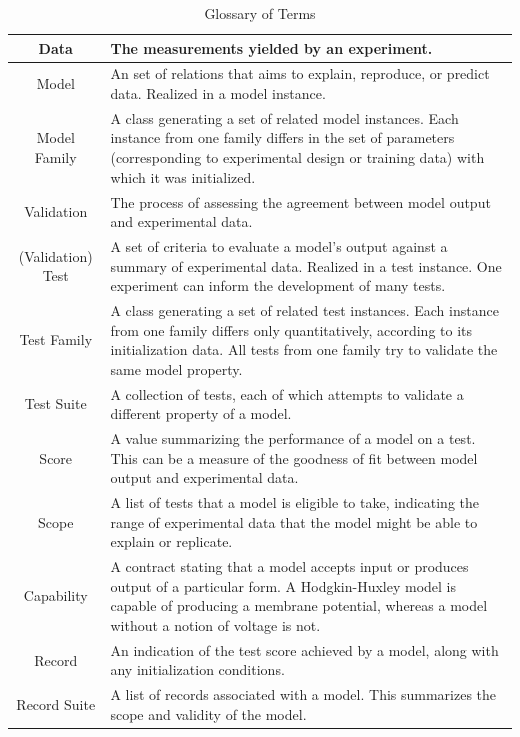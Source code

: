 \documentclass[11pt,letterpaper]{article}
\begin{document}
\begin{table}[h]\footnotesize
\caption{Glossary of Terms}
\label{table:glossary}
\begin{tabular}{| c | p{13.5cm} |}
\hline
Data & The measurements yielded by an experiment.\\ \hline  
Model & An set of relations that aims to explain, reproduce, or predict data.  Realized in a model instance.\\ \hline
Model Family & A class generating a set of related model instances. Each instance from one family differs in the set of parameters (corresponding to experimental design or training data) with which it was initialized.\\ \hline  
Validation	 & The process of assessing the agreement between model output and experimental data.\\ \hline
(Validation) Test & A set of criteria to evaluate a model's output against a summary of experimental data. Realized in a test instance.  One experiment can inform the development of many tests.\\ \hline  
Test Family & A class generating a set of related test instances.  Each instance from one family differs only quantitatively, according to its initialization data.  All tests from one family try to validate the same model property.\\ \hline
Test Suite & A collection of tests, each of which attempts to validate a different property of a model.\\ \hline  
Score & A value summarizing the performance of a model on a test. This can be a measure of the goodness of fit between model output and experimental data.\\ \hline
Scope & A list of tests that a model is eligible to take, indicating the range of experimental data that the model might be able to explain or replicate.\\ \hline
Capability & A contract stating that a model accepts input or produces output of a particular form. A Hodgkin-Huxley model is capable of producing a membrane potential, whereas a model without a notion of voltage is not.\\ \hline
Record & An indication of the test score achieved by a model, along with any initialization conditions.\\ \hline
Record Suite & A list of records associated with a model.  This summarizes the scope and validity of the model.\\ \hline  
\end{tabular}
\vspace{-12px}
\end{table}
\end{document}
